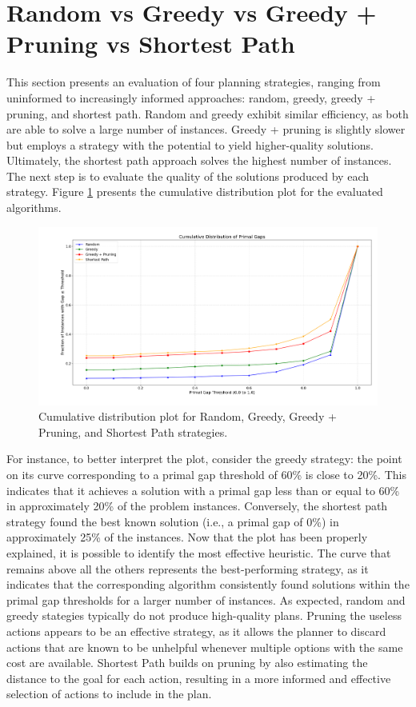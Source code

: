 \section{Random vs Greedy vs Greedy + Pruning vs Shortest Path}
This section presents an evaluation of four planning strategies, ranging from uninformed to increasingly informed approaches:
random, greedy, greedy + pruning, and shortest path.
Random and greedy exhibit similar efficiency, as both are able to solve a large number of instances. Greedy + pruning is
slightly slower but employs a strategy with the potential to yield higher-quality solutions. Ultimately, the shortest path approach
solves the highest number of instances. The next step is to evaluate the quality of the solutions produced by each strategy.
Figure \ref{fig:rgps} presents the cumulative distribution plot for the evaluated algorithms.

\begin{figure}[ht]
	\centering
	\includegraphics[width=\textwidth]{images/algs0124.png}
	\caption{Cumulative distribution plot for Random, Greedy, Greedy + Pruning, and Shortest Path strategies.}
	\label{fig:rgps}
\end{figure}

For instance, to better interpret the plot, consider the greedy strategy: the point on its curve corresponding to
a primal gap threshold of 60\% is close to 20\%. This indicates that it achieves a solution with a primal gap less than
or equal to 60\% in approximately 20\% of the problem instances.
Conversely, the shortest path strategy found the best known solution (i.e., a primal gap of 0\%) in approximately
25\% of the instances.
Now that the plot has been properly explained, it is possible to identify the most effective heuristic.
The curve that remains above all the others represents the best-performing strategy, as it indicates that the corresponding
algorithm consistently found solutions within the primal gap thresholds for a larger number of instances.
As expected, random and greedy stategies typically do not produce high-quality plans. Pruning the useless actions appears to be
an effective strategy, as it allows the planner to discard actions that are known to be unhelpful whenever multiple
options with the same cost are available.
Shortest Path builds on pruning by also estimating the distance to the goal for each action, resulting in a more
informed and effective selection of actions to include in the plan.


